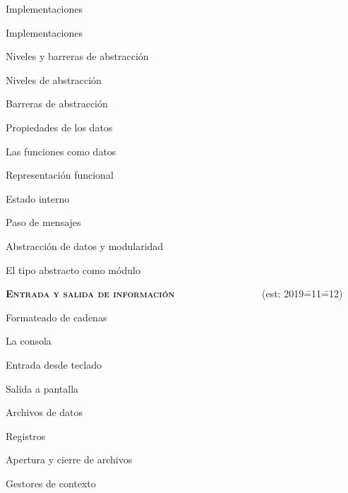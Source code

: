 \begin{longenum}
\begin{longenum}
        \item Implementaciones
        \begin{longenum}
            \item Implementaciones
        \end{longenum}
        \item Niveles y barreras de abstracción
        \begin{longenum}
            \item Niveles de abstracción
            \item Barreras de abstracción
            \item Propiedades de los datos
        \end{longenum}
        \item Las funciones como datos
        \begin{longenum}
            \item Representación funcional
            \item Estado interno
            \item Paso de mensajes
        \end{longenum}
        \item Abstracción de datos y modularidad
        \begin{longenum}
            \item El tipo abstracto como módulo
        \end{longenum}
    \end{longenum}
    \item \textbf{\textsc{Entrada y salida de información}} \ \ \ \ \ \ \ \ \ \ \ \ \ \ \ \ \ (est: 2019\==11\==12)
    \begin{longenum}
        \item Formateado de cadenas
        \item La consola
        \begin{longenum}
            \item Entrada desde teclado
            \item Salida a pantalla
        \end{longenum}
        \item Archivos de datos
        \begin{longenum}
            \item Registros
            \item Apertura y cierre de archivos
            \item Gestores de contexto

\end{longenum}
\end{longenum}
\end{longenum}
